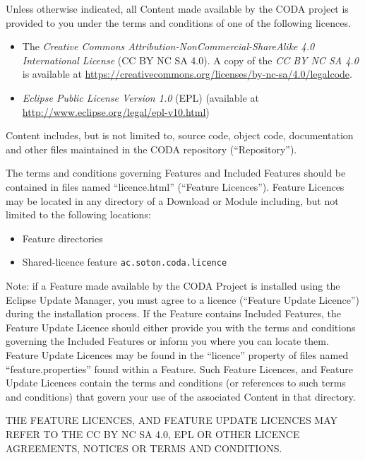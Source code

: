 Unless otherwise indicated, all Content made available by the CODA
project is provided to you under the terms and conditions of one of
the following licences.

\begin{itemize}
\item The \emph{Creative Commons Attribution-NonCommercial-ShareAlike 4.0
    International License} (CC BY NC SA 4.0).  A copy of the \emph{CC BY NC SA
    4.0} is available at \url{https://creativecommons.org/licenses/by-nc-sa/4.0/legalcode}.

\item \emph{Eclipse Public License Version 1.0} (EPL) (available at 
   \url{http://www.eclipse.org/legal/epl-v10.html})
\end{itemize}

Content includes, but is not limited to, source code, object code,
documentation and other files maintained in the CODA repository (``Repository'').

The terms and conditions governing Features and Included Features
should be contained in files named ``licence.html'' (``Feature
Licences'').  Feature Licences may be located in any directory of a
Download or Module including, but not limited to the following
locations:

\begin{itemize}
\item Feature directories

\item Shared-licence feature \texttt{ac.soton.coda.licence}
\end{itemize}

Note: if a Feature made available by the CODA Project is
installed using the Eclipse Update Manager, you must agree to a
licence (``Feature Update Licence'') during the installation process.
If the Feature contains Included Features, the Feature Update
Licence should either provide you with the terms and conditions
governing the Included Features or inform you where you can locate
them.  Feature Update Licences may be found in the ``licence''
property of files named ``feature.properties'' found within a
Feature.  Such Feature Licences, and Feature Update
Licences contain the terms and conditions (or references to such
terms and conditions) that govern your use of the associated
Content in that directory.

THE FEATURE LICENCES, AND FEATURE UPDATE LICENCES MAY REFER
TO THE CC BY NC SA 4.0, EPL OR OTHER LICENCE AGREEMENTS, NOTICES OR TERMS AND
CONDITIONS.

